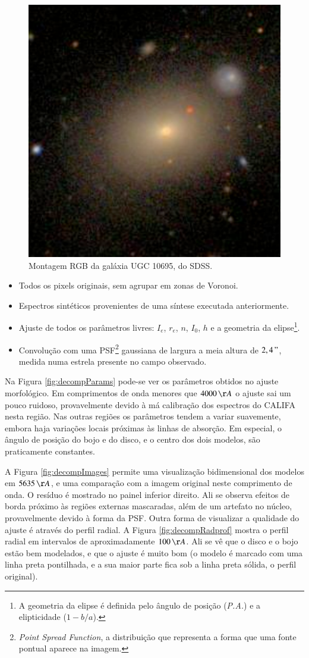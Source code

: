 \begin{figure}
	\includegraphics[width=0.3\columnwidth]{figuras/K0846}
	\caption[Montagem RGB da galáxia UGC 10695, do SDSS] {Montagem RGB da galáxia 
	UGC 10695, do SDSS.}
	\label{fig:decompTarget}
\end{figure}

\begin{itemize}

	\item Todos os pixels originais, sem agrupar em zonas de Voronoi.

	\item Espectros sintéticos provenientes de uma síntese executada anteriormente.

	\item Ajuste de todos os parâmetros livres: $I_e$, $r_e$, $n$, $I_0$, $h$ e a
	geometria da elipse\footnote{A geometria da elipse é definida pelo ângulo de
	posição ({\em P.A.}) e a elipticidade ($1 - b/a$).}.

	\item Convolução com uma PSF\footnote{{\em Point Spread Function}, a
	distribuição que representa a forma que uma fonte pontual aparece na imagem.}
	gaussiana de largura a meia altura de $2,4\,"$, medida numa estrela presente no
	campo observado.

\end{itemize}

Na Figura \ref{fig:decompParams} pode-se ver os parâmetros obtidos no ajuste
morfológico. Em comprimentos de onda menores que $4000\,\AA$ o ajuste sai um
pouco ruidoso, provavelmente devido à má calibração dos espectros do CALIFA
nesta região. Nas outras regiões os parâmetros tendem a variar suavemente,
embora haja variações locais próximas às linhas de absorção. Em especial, o
ângulo de posição do bojo e do disco, e o centro dos dois modelos, são
praticamente constantes.

A Figura \ref{fig:decompImages} permite uma visualização bidimensional dos
modelos em $5635\,\AA$, e uma comparação com a imagem original neste comprimento
de onda. O resíduo é mostrado no painel inferior direito. Ali se observa efeitos
de borda próximo às regiões externas mascaradas, além de um artefato no núcleo,
provavelmente devido à forma da PSF. Outra forma de visualizar a qualidade do
ajuste é através do perfil radial. A Figura \ref{fig:decompRadprof} mostra o
perfil radial em intervalos de aproximadamente $100\,\AA$. Ali se vê que o disco
e o bojo estão bem modelados, e que o ajuste é muito bom (o modelo é marcado com
uma linha preta pontilhada, e a sua maior parte fica sob a linha preta sólida, o
perfil original).

